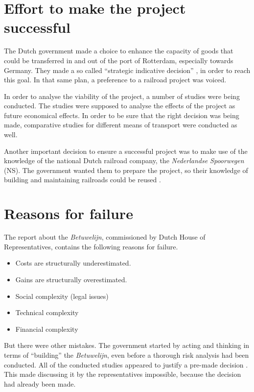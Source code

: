 \documentclass[]{uva-bachelor-thesis}
\begin{document}
\section{Effort to make the project successful}
The Dutch government made a choice to enhance the capacity of goods that could be transferred in and out of the port of Rotterdam, especially towards Germany. 
They made a so called ``strategic indicative decision'' \cite{beleidsinformatie-betuweroute}, in order to reach this goal. 
In that same plan, a preference to a railroad project was voiced. 

In order to analyse the viability of the project, a number of studies were being conducted.
The studies were supposed to analyse the effects of the project as future economical effects. 
In order to be sure that the right decision was being made, comparative studies for different means of transport were conducted as well.

Another important decision to ensure a successful project was to make use of the knowledge of the national Dutch railroad company, the \emph{Nederlandse Spoorwegen} (NS).
The government wanted them to prepare the project, so their knowledge of building and maintaining railroads could be reused \cite{beleidsinformatie-betuweroute}.

\section{Reasons for failure}
The report \cite{commissie-duivesteijn} about the \emph{Betuwelijn}, commissioned by Dutch House of Representatives, contains the following reasons for failure.
\begin{itemize}
  \item Costs are structurally underestimated.
  \item Gains are structurally overestimated.
  \item Social complexity (legal issues)
  \item Technical complexity
  \item Financial complexity
\end{itemize}

But there were other mistakes. 
The government started by acting and thinking in terms of ``building'' the \emph{Betuwelijn}, even before a thorough risk analysis had been conducted.
All of the conducted studies appeared to justify a pre-made decision \cite{commissie-duivesteijn}. 
This made discussing it by the representatives impossible, because the decision had already been made.
\end{document}
